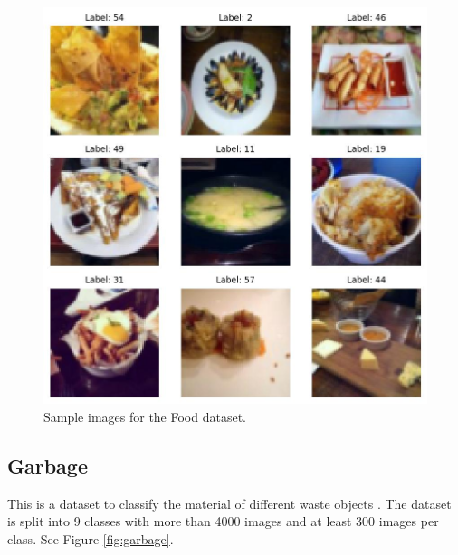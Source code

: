 \documentclass[letterpaper]{article} %
\theoremstyle{plain}
\theoremstyle{definition}
\theoremstyle{remark}
\begin{document}
\begin{figure}[htbp]
    \centering
    \includegraphics[width=\columnwidth]{../../images/food_1_sample.jpg}
    \caption{Sample images for the Food dataset.}
    \label{fig:food}
\end{figure}

\subsection{Garbage} This is a dataset to classify the material of different waste objects \citep{single2023realwaste}. The dataset is split into 9 classes with more than 4000 images and at least 300 images per class. See Figure \ref{fig:garbage}.
\end{document}
